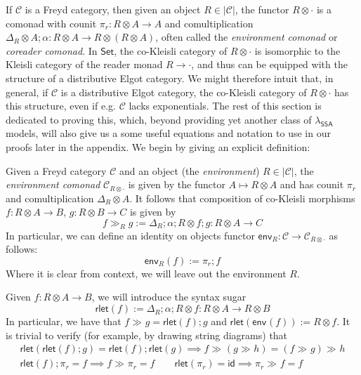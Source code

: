 \documentclass[acmsmall,screen,review]{acmart}
\newcommand{\mc}[1]{\ensuremath{\mathcal{#1}}}
\newcommand{\ms}[1]{\ensuremath{\mathsf{#1}}}
\newcommand{\dmor}[1]{{\Delta}_{#1}}
\newcommand{\envcom}[2]{{#1}_{#2 \otimes \cdot}}
\newcommand{\rlmor}[1]{\ms{rlet}(#1)}
\newcommand{\rseq}[3]{#2 \gg_{#1} #3}
\newcommand{\toenv}[2]{\ms{env}_{#1}(#2)}
\newcommand{\isotopessa}{\(\lambda_{\ms{SSA}}\)}
\begin{document}
If $\mc{C}$ is a Freyd category, then given an object $R \in |\mc{C}|$, the functor $R \otimes
\cdot$ is a comonad with counit $\pi_r : R \otimes A \to A$ and comultiplication $\dmor{R} \otimes A
; \alpha : R \otimes A \to R \otimes (R \otimes A)$, often called the \emph{environment comonad} or
\emph{coreader comonad}. In $\ms{Set}$, the co-Kleisli category of $R \otimes \cdot$ is isomorphic
to the Kleisli category of the reader monad $R \to \cdot$, and thus can be equipped with the
structure of a distributive Elgot category. We might therefore intuit that, in general, if $\mc{C}$
is a distributive Elgot category, the co-Kleisli category of $R \otimes \cdot$ has this structure,
even if e.g. $\mc{C}$ lacks exponentials. The rest of this section is dedicated to proving this,
which, beyond providing yet another class of \isotopessa{} models, will also give us a some useful
equations and notation to use in our proofs later in the appendix.
%
We begin by giving an explicit definition:
\begin{definition}
  Given a Freyd category $\mc{C}$ and an object (the \emph{environment}) $R \in |\mc{C}|$, the
  \emph{environment comonad} $\envcom{\mc{C}}{R}$ is given by the functor $A \mapsto R \otimes A$
  and has counit $\pi_r$ and comultiplication $\Delta_R \otimes A$. It follows that composition of
  co-Kleisli morphisms $f : R \otimes A \to B$, $g : R \otimes B \to C$ is given by
  \begin{equation}
    \rseq{R}{f}{g} := \dmor{R} ; \alpha ; R \otimes f ; g : R \otimes A \to C
  \end{equation}
  In particular, we can define an identity on objects functor $\ms{env}_R : \mc{C} \to
  \envcom{\mc{C}}{R}$ as follows:
  \begin{equation}
    \toenv{R}{f} := \pi_r ; f
  \end{equation}
  Where it is clear from context, we will leave out the environment $R$.
\end{definition}
%
Given $f : R \otimes A \to B$, we will introduce the syntax sugar
\begin{equation}
  \rlmor{f} := \dmor{R} ; \alpha ; R \otimes f : R \otimes A \to R \otimes B
\end{equation}
In particular, we have that $\rseq{}{f}{g} = \rlmor{f} ; g$ and $\rlmor{\toenv{}{f}} := R \otimes
f$. It is trivial to verify (for example, by drawing string diagrams) that
\begin{equation}
  \begin{gathered}
  \rlmor{\rlmor{f} ; g} = \rlmor{f} ; \rlmor{g} 
  \implies \rseq{}{f}{(\rseq{}{g}{h})} = \rseq{}{(\rseq{}{f}{g})}{h} \\
  \rlmor{f} ; \pi_r = f \implies \rseq{}{f}{\pi_r} = f \qquad
  \rlmor{\pi_r} = \ms{id} \implies \rseq{}{\pi_r}{f} = f
\end{gathered}
\end{equation}
\end{document}
